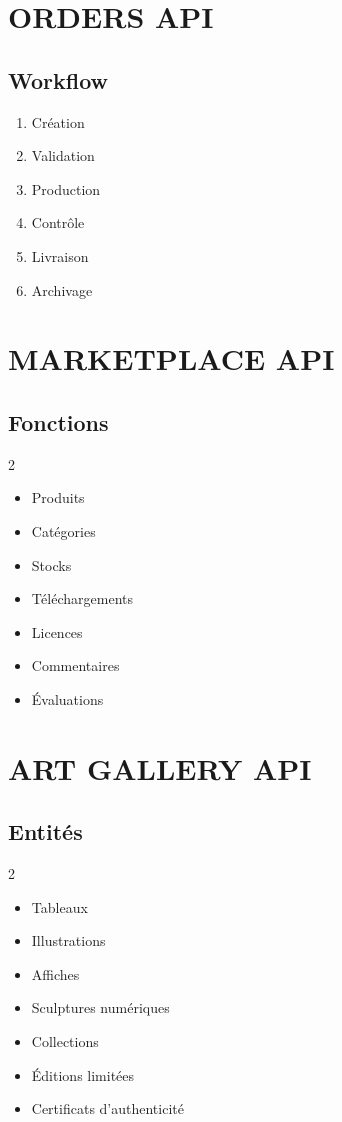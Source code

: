 \documentclass[12pt,a4paper,oneside]{book}
\begin{document}
\chapter{ORDERS API}

\section{Workflow}
\begin{enumerate}
\item Création
\item Validation
\item Production
\item Contrôle
\item Livraison
\item Archivage
\end{enumerate}

\chapter{MARKETPLACE API}

\section{Fonctions}
\begin{multicols}{2}
\begin{itemize}
\item Produits
\item Catégories
\item Stocks
\item Téléchargements
\item Licences
\item Commentaires
\item Évaluations
\end{itemize}
\end{multicols}

\chapter{ART GALLERY API}

\section{Entités}
\begin{multicols}{2}
\begin{itemize}
\item Tableaux
\item Illustrations
\item Affiches
\item Sculptures numériques
\item Collections
\item Éditions limitées
\item Certificats d'authenticité
\end{itemize}
\end{multicols}
\end{document}
